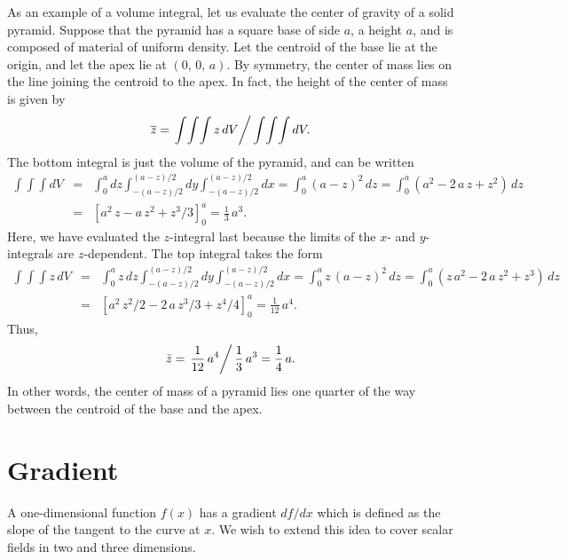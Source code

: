 As an example
of a volume integral, let us evaluate the center of gravity of a solid pyramid. Suppose that
the pyramid has a square base of side $a$, a  height $a$, and is composed of material of uniform density. Let the centroid of the base lie at the origin, and let
the apex lie at $(0,\,0,\,a)$. 
By symmetry, the center of mass lies on the line joining the centroid  to the apex. 
In fact, the height of the center of mass is given by
\begin{equation}
\overline{z} = \left. \int\!\int\!\int z\,dV\right/ \int\!\int\!\int dV.
\end{equation}
The bottom integral is  just the volume of the pyramid, and can be written
\begin{eqnarray}
\int\!\int\!\int dV &=& \int_0^a dz \int_{-(a-z)/2}^{(a-z)/2} dy\int_{-(a-z)/2}^{(a-z)/2} dx = \int_0^a (a-z)^2\,dz=\int_0^a (a^2-2\,a\,z+z^2)\,dz\nonumber\\[0.5ex]
& =& \left[a^2\,z-a\,z^2+z^3/3\right]_0^a= \frac{1}{3}\,a^3.
\end{eqnarray}
Here, we have evaluated the $z$-integral last because the limits of the $x$- and $y$- integrals are $z$-dependent. 
The top integral takes the form
\begin{eqnarray}
\int\!\int\!\int z\,dV &=& \int_0^a z\,dz \int_{-(a-z)/2}^{(a-z)/2} dy\int_{-(a-z)/2}^{(a-z)/2} dx = \int_0^a z\,(a-z)^2\,dz=\int_0^a (z\,a^2-2\,a\,z^2+z^3)\,dz\nonumber\\[0.5ex]
& =& \left[a^2\,z^2/2-2\,a\,z^3/3+z^4/4\right]_0^a= \frac{1}{12}\,a^4.
\end{eqnarray}
Thus,
\begin{equation}
\bar{z} = \left.\frac{1}{12}\,a^4\right/\frac{1}{3}\,a^3 = \frac{1}{4}\,a.
\end{equation}
In other words, the center of mass of a pyramid lies one quarter of the way between the centroid of the base and the apex. 

\section{Gradient}\label{sgrad}
A one-dimensional function $f(x)$ has a  gradient $df/dx$ which is
defined as the slope of the tangent to the curve at $x$. 
We wish to extend this idea to cover scalar fields in two and three dimensions. 

